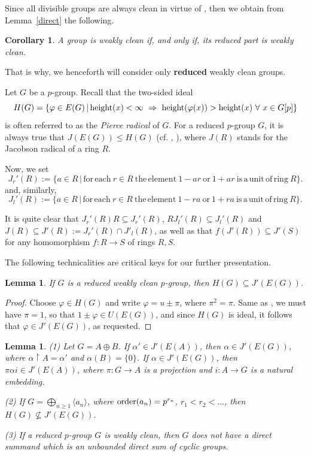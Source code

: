 \documentclass{amsart}
\newtheorem{lemma}[theorem]{Lemma}
\newtheorem{corollary}[theorem]{Corollary}
\theoremstyle{definition}
\theoremstyle{remark}
\numberwithin{equation}{section}
\begin{document}
Since all divisible groups are always clean in virtue of \cite[Lemma 3]{GV}, then we obtain from Lemma~\ref{direct} the following.

\begin{corollary}
A group is weakly clean if, and only if, its reduced part is weakly clean.
\end{corollary}

That is why, we henceforth will consider only {\bf reduced} weakly clean groups.

\medskip

Let $G$ be a $p$-group. Recall that the two-sided ideal
$$H(G)=\{\varphi\in E(G)\, |\, {\rm height}(x)<\infty\ \Rightarrow\ {\rm height}(\varphi(x)) > {\rm height}(x)\ \forall \ x\in G[p]\}$$
is often referred to as the \emph{Pierce radical} of $G$. For a reduced $p$-group $G$, it is always true that $J(E(G))\leq H(G)$ (cf. \cite{P63}, \cite{KMT}), where $J(R)$ stands for the Jacobson radical of a ring $R$.

\medskip

Now, we set
\[
J_r'(R):=\{a\in R\,|\, \mathrm{for\, each}\ r\in R\
\mathrm{the\, element}\ 1-ar \ \mathrm{or}\ 1+ar
\ \mathrm{is\, a\, unit\, of\, ring}\ R\}.
\]
and, similarly,
\[
J_l'(R):=\{a\in R\,|\, \mathrm{for\, each}\ r\in R\
\mathrm{the\, element}\ 1-ra \ \mathrm{or}\ 1+ra
\ \mathrm{is\, a\, unit\, of\, ring}\ R\}.
\]

It is quite clear that $J_r'(R)R\subseteq J_r'(R)$, $RJ_l'(R)\subseteq J_l'(R)$ and $J(R)\subseteq J'(R):=J_r'(R)\cap J'_l(R)$, as well as that $f(J'(R))\subseteq J'(S)$ for any homomorphism $f: R\to S$ of rings $R, S$.

\medskip

The following technicalities are critical keys for our further presentation.

\begin{lemma}
If $G$ is a reduced weakly clean $p$-group, then $H(G)\subseteq J'(E(G))$.
\end{lemma}

\begin{proof} Choose $\varphi\in H(G)$ and write $\varphi=u \pm \pi$, where $\pi^2=\pi$. Same as \cite[Lemma 5]{GV}, we must have $\pi =1$, so that $1\pm\varphi\in U(E(G))$, and since $H(G)$ is ideal, it follows that $\varphi\in J'(E(G))$, as requested.
\end{proof}

\begin{lemma}\label{threepoints}
(1) Let $G=A\oplus B$. If $\alpha'\in J'(E(A))$, then $\alpha\in J'(E(G))$, where $\alpha\!\upharpoonright\!A=\alpha'$ and $\alpha(B)=\{0\}$. If $\alpha\in J'(E(G))$, then $\pi\alpha i\in J'(E(A))$, where $\pi: G\to A$ is a projection and $i:A\to G$ is a natural embedding.

(2) If $G=\bigoplus_{n\geq 1}\langle a_n\rangle$, where ${\rm order}(a_n)=p^{r_n}$, $r_1<r_2<\dots$, then
$H(G)\nsubseteq J'(E(G))$.

(3) If a reduced $p$-group $G$ is weakly clean, then $G$ does not have a direct summand which is an unbounded direct sum of cyclic groups.
\end{lemma}
\end{document}
